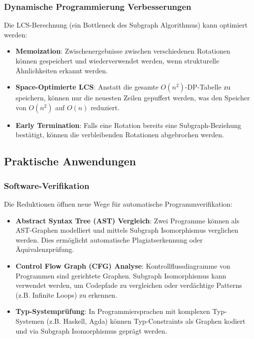 ﻿\documentclass[a4paper,12pt]{article}
\theoremstyle{definition}
\begin{document}
\subsubsection{Dynamische Programmierung Verbesserungen}

Die LCS-Berechnung (ein Bottleneck des Subgraph Algorithmus) kann optimiert werden:

\begin{itemize}
	\item \textbf{Memoization}: Zwischenergebnisse zwischen verschiedenen Rotationen können gespeichert und wiederverwendet werden, wenn strukturelle Ähnlichkeiten erkannt werden.
	
	\item \textbf{Space-Optimierte LCS}: Anstatt die gesamte $O(n^2)$-DP-Tabelle zu speichern, können nur die neuesten Zeilen gepuffert werden, was den Speicher von $O(n^2)$ auf $O(n)$ reduziert.
	
	\item \textbf{Early Termination}: Falls eine Rotation bereits eine Subgraph-Beziehung bestätigt, können die verbleibenden Rotationen abgebrochen werden.
\end{itemize}

\subsection{Praktische Anwendungen}

\subsubsection{Software-Verifikation}

Die Reduktionen öffnen neue Wege für automatische Programmverifikation:

\begin{itemize}
	\item \textbf{Abstract Syntax Tree (AST) Vergleich}: Zwei Programme können als AST-Graphen modelliert und mittels Subgraph Isomorphismus verglichen werden. Dies ermöglicht automatische Plagiatserkennung oder Äquivalenzprüfung.
	
	\item \textbf{Control Flow Graph (CFG) Analyse}: Kontrollflussdiagramme von Programmen sind gerichtete Graphen. Subgraph Isomorphismus kann verwendet werden, um Codepfade zu vergleichen oder verdächtige Patterns (z.B. Infinite Loops) zu erkennen.
	
	\item \textbf{Typ-Systemprüfung}: In Programmiersprachen mit komplexen Typ-Systemen (z.B. Haskell, Agda) können Typ-Constraints als Graphen kodiert und via Subgraph Isomorphismus geprägt werden.
\end{itemize}
\end{document}
